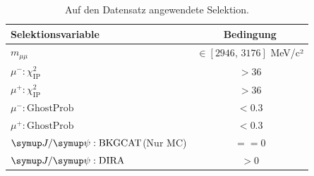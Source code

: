 \begin{table}[htb]
  \centering
  \caption{Auf den Datensatz angewendete Selektion.}
  \begin{tabular}{lc}
    \toprule
    Selektionsvariable                & Bedingung      \\
    \midrule
    $m_{\mu\mu}$                      & $\in[\num{2946},\,\num{3176}]$ MeV/c²  \\
    $\mu^{-}:\chi_{\text{IP}}^2$      & $>\num{36}$  \\
    $\mu^{+}:\chi_{\text{IP}}^2$      & $>\num{36}$  \\
    $\mu^{-}:\text{GhostProb}$        & $<\num{0.3}$ \\
    $\mu^{+}:\text{GhostProb}$        & $<\num{0.3}$ \\
    $\jpsi:\text{BKGCAT}$(Nur MC)     & $==\num{0}$  \\
    $\jpsi:\text{DIRA}$               & $>\num{0}$  \\
    \bottomrule
  \end{tabular}
  \label{tab:strip}
\end{table}

